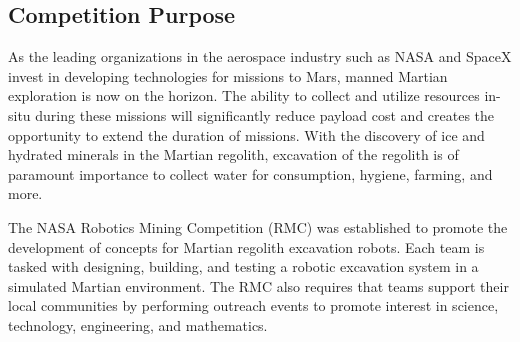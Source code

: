 \documentclass[class=article, crop=false]{standalone}
\begin{document}
	\subsection{Competition Purpose}
	\label{subsec:competition_purpose}
	As the leading organizations in the aerospace industry such as NASA and SpaceX invest in developing technologies for missions to Mars, manned Martian exploration is now on the horizon. The ability to collect and utilize resources in-situ during these missions will significantly reduce payload cost and creates the opportunity to extend the duration of missions. With the discovery of ice and hydrated minerals in the Martian regolith, excavation of the regolith is of paramount importance to collect water for consumption, hygiene, farming, and more.
	
	The NASA Robotics Mining Competition (RMC) was established to promote the development of concepts for Martian regolith excavation robots. Each team is tasked with designing, building, and testing a robotic excavation system in a simulated Martian environment. The RMC also requires that teams support their local communities by performing outreach events to promote interest in science, technology, engineering, and mathematics.
	
	
	
\end{document}
